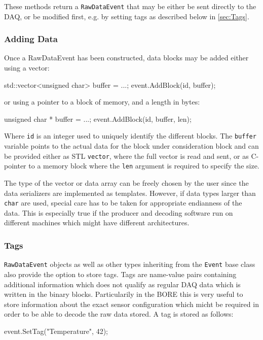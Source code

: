 These methods return a \texttt{RawDataEvent} that may be either be sent directly to the DAQ,
or be modified first, e.g. by setting tags as described below in \autoref{sec:Tags}.

\subsubsection{Adding Data}
Once a RawDataEvent has been constructed,
data blocks may be added either using a vector:
\begin{listing}
std::vector<unsigned char> buffer = ...;
event.AddBlock(id, buffer);
\end{listing}

or using a pointer to a block of memory, and a length in bytes:
\begin{listing}
unsigned char * buffer = ...;
event.AddBlock(id, buffer, len);
\end{listing}

Where \texttt{id} is an integer used to uniquely identify the different blocks.
The \texttt{buffer} variable points to the actual data for the block under consideration block and can be provided either as STL \texttt{vector}, where the full vector is read and sent, or as C-pointer to a memory block where the \texttt{len} argument is required to specify the size.

The type of the vector or data array can be freely chosen by the user since the data serializers are implemented as templates.
However, if data types larger than \texttt{char} are used, special care has to be taken for appropriate endianness of the data.
This is especially true if the producer and decoding software run on different machines which might have different architectures.


\subsubsection{Tags}\label{sec:Tags}
\texttt{RawDataEvent} objects as well as other types inheriting from the \texttt{Event} base class also provide the option to store tags.
Tags are name-value pairs containing additional information which does not qualify as regular DAQ data which is written in the binary blocks.
Particularily in the \gls{BORE} this is very useful to store information about the exact sensor configuration which micht be required in order to be able to decode the raw data stored.
A tag is stored as follows:
\begin{listing}
event.SetTag("Temperature", 42);
\end{listing}

